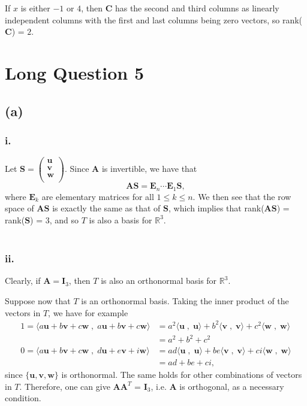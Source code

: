 \documentclass{article}
\begin{document}
If $x$ is either $-1$ or $4$, then $\mathbf{C}$ has the second and third columns as linearly independent columns with the first and last columns being zero vectors, so rank($\mathbf{C}$) = $2$.
\section*{Long Question 5}
\subsection*{(a)}
\subsubsection*{i.}

Let $\mathbf{S} = \begin{pmatrix}
    \mathbf{u} \\
    \mathbf{v} \\
    \mathbf{w} \\
\end{pmatrix}$.
Since $\mathbf{A}$ is invertible, we have that
\[\mathbf{A} \mathbf{S} = \mathbf{E}_n \cdots \mathbf{E}_1 \mathbf{S}, \]
where $\mathbf{E}_k$ are elementary matrices for all $1 \leq k \leq n$. We then see that the row space of $\mathbf{A} \mathbf{S}$ is exactly the same as that of $\mathbf{S}$, which implies that rank($\mathbf{A} \mathbf{S}$) = rank($\mathbf{S}$) = 3, and so $T$ is also a basis for $\mathbb{R}^3$. \\\\
\subsubsection*{ii.}

Clearly, if $\mathbf{A} = \mathbf{I}_3$, then $T$ is also an orthonormal basis for $\mathbb{R}^3$.

Suppose now that $T$ is an orthonormal basis. Taking the inner product of the vectors in $T$, we have for example
\begin{align*}
    1 = \langle  a\mathbf{u} + b\mathbf{v} + c\mathbf{w}\; , \; a\mathbf{u} + b\mathbf{v} + c\mathbf{w}\rangle &= a^2 \langle  \mathbf{u} \; , \; \mathbf{u}\rangle + b^2 \langle  \mathbf{v} \; , \; \mathbf{v}\rangle + c^2 \langle  \mathbf{w} \; , \; \mathbf{w}\rangle \\
    &= a^2 + b^2 + c^2 \\
    0 = \langle  a\mathbf{u} + b\mathbf{v} + c\mathbf{w}\; , \; d\mathbf{u} + e\mathbf{v} + i\mathbf{w}\rangle &= ad \langle  \mathbf{u} \; , \; \mathbf{u}\rangle + be \langle  \mathbf{v} \; , \; \mathbf{v}\rangle + ci \langle  \mathbf{w} \; , \; \mathbf{w}\rangle \\
    &= ad + be + ci,
\end{align*}
since $\{\mathbf{u}, \mathbf{v}, \mathbf{w}\}$ is orthonormal. The same holds for other combinations of vectors in $T$. Therefore, one can give $\mathbf{A} \mathbf{A}^{T}$ = $\mathbf{I}_3$, i.e. $\mathbf{A}$ is orthogonal, as a necessary condition. 
\end{document}
